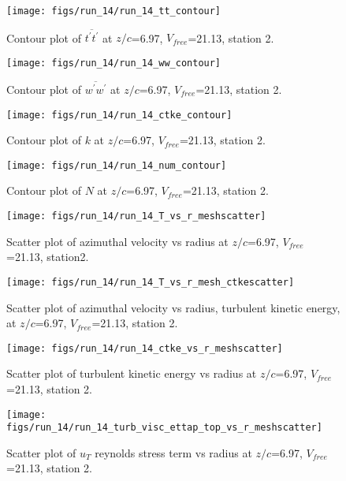 \begin{figure}[H]
\centering
\texttt{[image: figs/run\_14/run\_14\_tt\_contour]}
\caption{Contour plot of $\overline{t^\prime t^\prime}$ at $z/c$=6.97, $V_{free}$=21.13, station 2.}
\end{figure}


\begin{figure}[H]
\centering
\texttt{[image: figs/run\_14/run\_14\_ww\_contour]}
\caption{Contour plot of $\overline{w^\prime w^\prime}$ at $z/c$=6.97, $V_{free}$=21.13, station 2.}
\end{figure}


\begin{figure}[H]
\centering
\texttt{[image: figs/run\_14/run\_14\_ctke\_contour]}
\caption{Contour plot of $k$ at $z/c$=6.97, $V_{free}$=21.13, station 2.}
\end{figure}


\begin{figure}[H]
\centering
\texttt{[image: figs/run\_14/run\_14\_num\_contour]}
\caption{Contour plot of $N$ at $z/c$=6.97, $V_{free}$=21.13, station 2.}
\end{figure}


\begin{figure}[H]
\centering
\texttt{[image: figs/run\_14/run\_14\_T\_vs\_r\_meshscatter]}
\caption{Scatter plot of azimuthal velocity vs radius at $z/c$=6.97, $V_{free}$=21.13, station2.}
\end{figure}


\begin{figure}[H]
\centering
\texttt{[image: figs/run\_14/run\_14\_T\_vs\_r\_mesh\_ctkescatter]}
\caption{Scatter plot of azimuthal velocity vs radius, turbulent kinetic energy, at $z/c$=6.97, $V_{free}$=21.13, station 2.}
\end{figure}


\begin{figure}[H]
\centering
\texttt{[image: figs/run\_14/run\_14\_ctke\_vs\_r\_meshscatter]}
\caption{Scatter plot of turbulent kinetic energy vs radius at $z/c$=6.97, $V_{free}$=21.13, station 2.}
\end{figure}


\begin{figure}[H]
\centering
\texttt{[image: figs/run\_14/run\_14\_turb\_visc\_ettap\_top\_vs\_r\_meshscatter]}
\caption{Scatter plot of $
u_T$ reynolds stress term vs radius at $z/c$=6.97, $V_{free}$=21.13, station 2.}
\end{figure}


